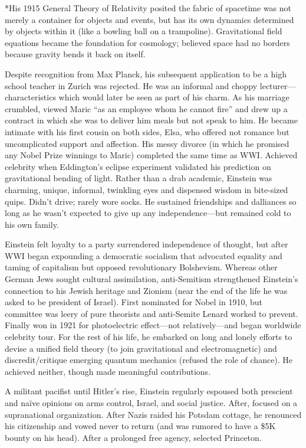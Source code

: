 \documentclass[
]{article}
\begin{document}
*His 1915 General Theory of Relativity posited the fabric of spacetime
was not merely a container for objects and events, but has its own
dynamics determined by objects within it (like a bowling ball on a
trampoline). Gravitational field equations became the foundation for
cosmology; believed space had no borders because gravity bends it back
on itself.

Despite recognition from Max Planck, his subsequent application to be a
high school teacher in Zurich was rejected. He was an informal and
choppy lecturer---characteristics which would later be seen as part of
his charm. As his marriage crumbled, viewed Maric ``as an employee whom
he cannot fire'' and drew up a contract in which she was to deliver him
meals but not speak to him. He became intimate with his first cousin on
both sides, Elsa, who offered not romance but uncomplicated support and
affection. His messy divorce (in which he promised any Nobel Prize
winnings to Maric) completed the same time as WWI. Achieved celebrity
when Eddington's eclipse experiment validated his prediction on
gravitational bending of light. Rather than a drab academic, Einstein
was charming, unique, informal, twinkling eyes and dispensed wisdom in
bite-sized quips. Didn't drive; rarely wore socks. He sustained
friendships and dalliances so long as he wasn't expected to give up any
independence---but remained cold to his own family.

Einstein felt loyalty to a party surrendered independence of thought,
but after WWI began expounding a democratic socialism that advocated
equality and taming of capitalism but opposed revolutionary Bolshevism.
Whereas other German Jews sought cultural assimilation, anti-Semitism
strengthened Einstein's connection to his Jewish heritage and Zionism
(near the end of the life he was asked to be president of Israel). First
nominated for Nobel in 1910, but committee was leery of pure theorists
and anti-Semite Lenard worked to prevent. Finally won in 1921 for
photoelectric effect---not relatively---and began worldwide celebrity
tour. For the rest of his life, he embarked on long and lonely efforts
to devise a unified field theory (to join gravitational and
electromagnetic) and discredit/critique emerging quantum mechanics
(refused the role of chance). He achieved neither, though made
meaningful contributions.

A militant pacifist until Hitler's rise, Einstein regularly espoused
both prescient and naïve opinions on arms control, Israel, and social
justice. After, focused on a supranational organization. After Nazis
raided his Potsdam cottage, he renounced his citizenship and vowed never
to return (and was rumored to have a \$5K bounty on his head). After a
prolonged free agency, selected Princeton.
\end{document}
